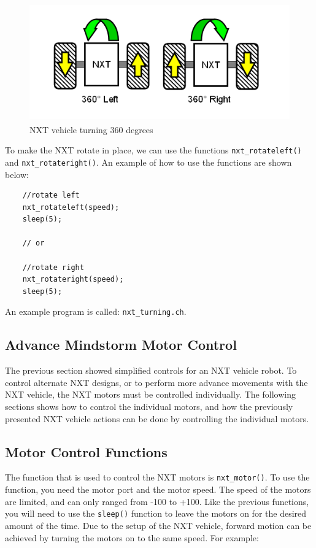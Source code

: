 \documentclass[12pt]{article}
\begin{document}
\begin{figure}[h]
  \begin{center}
    \includegraphics[height=2in]{figure/mindstorm/Vehicle_360LR.png}
    \caption{NXT vehicle turning 360 degrees \label{fig_NXT_360LR}}
  \end{center}
\end{figure}
\noindent

To make the NXT rotate in place, we can use the functions \verb+nxt_rotateleft()+ 
and \verb+nxt_rotateright()+.  An example of how to use the functions are shown 
below:

\begin{verbatim}
    //rotate left
    nxt_rotateleft(speed);
    sleep(5);
    
    // or
    
    //rotate right
    nxt_rotateright(speed);
    sleep(5);
\end{verbatim}
\noindent
An example program is called: \verb+nxt_turning.ch+.

\subsection{Advance Mindstorm Motor Control}

The previous section showed simplified controls for an NXT vehicle robot. To control 
alternate NXT designs, or to perform more advance movements with the NXT vehicle, the 
NXT motors must be controlled individually. The following sections shows how to control 
the individual motors, and how the previously presented NXT vehicle actions can be done 
by controlling the individual motors.

\subsection{Motor Control Functions}

The function that is used to control the NXT motors is \verb+nxt_motor()+. To use the function, you need the  
motor port and the motor speed. The speed of the motors are limited, and can 
only ranged from -100 to +100. Like the previous functions, you will need to use the \verb+sleep()+ 
function to leave the motors on for the desired amount of the time. Due to the setup of the NXT 
vehicle, forward motion can be achieved by turning the motors on to the same speed.  For example:
\end{document}
